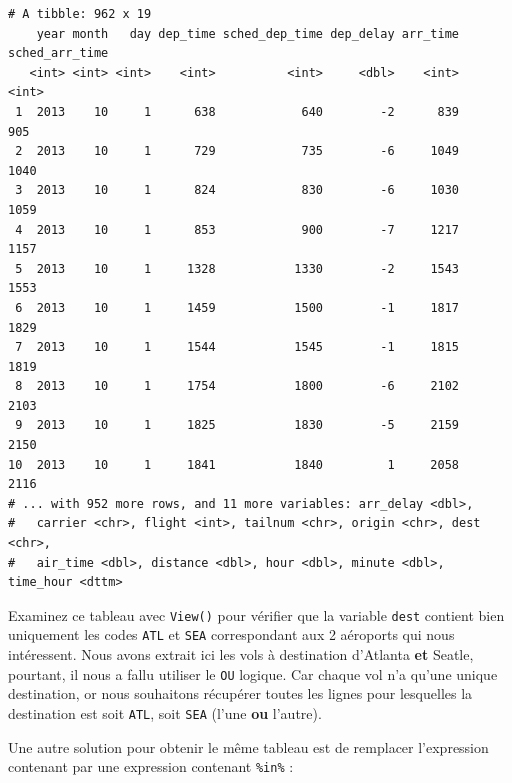 \documentclass[a4paperpaper,]{article}
\newenvironment{Shaded}{\begin{snugshade}}{\end{snugshade}}
\newcommand{\DecValTok}[1]{\textcolor[rgb]{0.69,0.50,0.00}{#1}}
\newcommand{\KeywordTok}[1]{\textcolor[rgb]{0.12,0.11,0.11}{\textbf{#1}}}
\newcommand{\NormalTok}[1]{\textcolor[rgb]{0.12,0.11,0.11}{#1}}
\newcommand{\OperatorTok}[1]{\textcolor[rgb]{0.12,0.11,0.11}{#1}}
\newcommand{\StringTok}[1]{\textcolor[rgb]{0.75,0.01,0.01}{#1}}
\theoremstyle{definition}
\theoremstyle{definition}
\theoremstyle{definition}
\theoremstyle{remark}
\begin{document}
\begin{verbatim}
# A tibble: 962 x 19
    year month   day dep_time sched_dep_time dep_delay arr_time sched_arr_time
   <int> <int> <int>    <int>          <int>     <dbl>    <int>          <int>
 1  2013    10     1      638            640        -2      839            905
 2  2013    10     1      729            735        -6     1049           1040
 3  2013    10     1      824            830        -6     1030           1059
 4  2013    10     1      853            900        -7     1217           1157
 5  2013    10     1     1328           1330        -2     1543           1553
 6  2013    10     1     1459           1500        -1     1817           1829
 7  2013    10     1     1544           1545        -1     1815           1819
 8  2013    10     1     1754           1800        -6     2102           2103
 9  2013    10     1     1825           1830        -5     2159           2150
10  2013    10     1     1841           1840         1     2058           2116
# ... with 952 more rows, and 11 more variables: arr_delay <dbl>,
#   carrier <chr>, flight <int>, tailnum <chr>, origin <chr>, dest <chr>,
#   air_time <dbl>, distance <dbl>, hour <dbl>, minute <dbl>, time_hour <dttm>
\end{verbatim}

Examinez ce tableau avec \texttt{View()} pour vérifier que la variable
\texttt{dest} contient bien uniquement les codes \texttt{ATL} et
\texttt{SEA} correspondant aux 2 aéroports qui nous intéressent. Nous
avons extrait ici les vols à destination d'Atlanta \textbf{et} Seatle,
pourtant, il nous a fallu utiliser le \texttt{OU} logique. Car chaque
vol n'a qu'une unique destination, or nous souhaitons récupérer toutes
les lignes pour lesquelles la destination est soit \texttt{ATL}, soit
\texttt{SEA} (l'une \textbf{ou} l'autre).

Une autre solution pour obtenir le même tableau est de remplacer
l'expression contenant \texttt{\textbar{}} par une expression contenant
\texttt{\%in\%} :

\begin{Shaded}
\end{Shaded}
\end{document}
